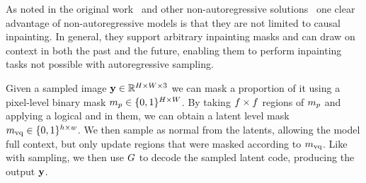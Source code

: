 As noted in the original work~\cite{savinov2022stepunrolled} and other
non-autoregressive solutions~\cite{bondtaylor2021unleashing} one clear advantage
of non-autoregressive models is that they are not limited to causal inpainting.
In general, they support arbitrary inpainting masks and can draw on context in
both the past and the future, enabling them to perform inpainting tasks not
possible with autoregressive sampling.

Given a sampled image $\mathbf{y} \in \mathbb{R}^{H \times W \times 3}$ we can mask a
proportion of it using a pixel-level binary mask $m_p \in \{0, 1\}^{H
\times W}$. By taking $f \times f$ regions of
$m_p$ and applying a logical and in them, we can obtain a latent level
mask $m_\textrm{vq} \in \{0,1\}^{h \times w}$. We then sample as normal from the
latents, allowing the model full context, but only update regions that were
masked according to $m_\textrm{vq}$. Like with sampling, we then use $G$
to decode the sampled latent code, producing the output $\mathbf{y}$.
